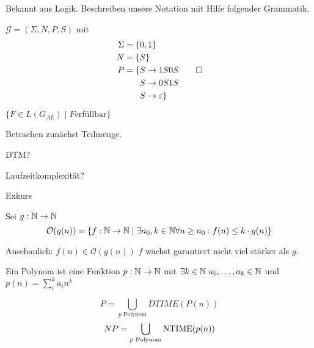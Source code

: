 {\color{red}

Bekannt aus Logik. Beschreiben unsere Notation mit Hilfe folgender Grammatik.

\begin{Bsp}\label{bsp:3.sameNumber}
  $\mathcal{G} = (\Sigma, N, P, S)$ mit
	\begin{align*}
		\Sigma &= \{ 0, 1 \}\\
		N &= \{S\}\\
		P &= \begin{aligned}[t]
      \{ S & \to 1S0S \\
        S & \to 0S1S \\
        S & \to \varepsilon
      \}
        \end{aligned}
      \qedhere
	\end{align*}
\end{Bsp}


$\{F\in L(G_{AL})\mid F \text{erfüllbar}\}$

Betrachen zunächst Teilmenge.

DTM?

Laufzeitkomplexität?

Exkurs
\begin{Def} Sei $g:\mathbb{N}\rightarrow\mathbb{N}$
$$\mathcal{O}(g(n)) = \{f:\mathbb{N}\rightarrow\mathbb{N} \mid \exists n_0, k\in\mathbb{N} \forall n\geq n_0: f(n)\leq k\cdot g(n)\}$$
\end{Def}

Anschaulich: $f(n)\in \mathcal{O}(g(n))$ $f$ wächst garantiert nicht viel stärker als $g$.


\bigskip

\begin{Def}[name={[Polynom]}]
	Ein Polynom ist eine Funktion $p:\N\->\N$ mit $\exists k\in \mathbb{N}\ a_0,\dots,a_k\in\mathbb{N}$ und \mbox{$p(n)=\sum_i^k a_in^k$}
\end{Def}
\begin{Def}
 \[ P = \bigcup_{p\text{ Polynom}} DTIME(P(n)) \]
 \[ NP = \bigcup_{p\text{ Polynom}} \operatorname{NTIME}(p(n)) \]
 
\end{Def}



}
